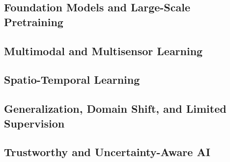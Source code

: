 \documentclass[11pt,a4paper]{article}
\begin{document}
\subsection{Foundation Models and Large-Scale Pretraining}


\subsection{Multimodal and Multisensor Learning}


\subsection{Spatio-Temporal Learning}


\subsection{Generalization, Domain Shift, and Limited Supervision}


\subsection{Trustworthy and Uncertainty-Aware AI}

\end{document}
